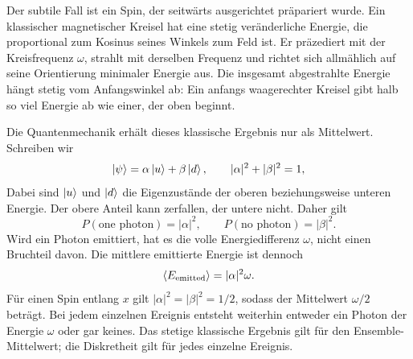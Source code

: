 Der subtile Fall ist ein Spin, der seitwärts ausgerichtet präpariert wurde. Ein klassischer magnetischer Kreisel hat eine stetig veränderliche Energie, die proportional zum Kosinus seines Winkels zum Feld ist. Er präzediert mit der Kreisfrequenz \(\omega\), strahlt mit derselben Frequenz und richtet sich allmählich auf seine Orientierung minimaler Energie aus. Die insgesamt abgestrahlte Energie hängt stetig vom Anfangswinkel ab: Ein anfangs waagerechter Kreisel gibt halb so viel Energie ab wie einer, der oben beginnt.

Die Quantenmechanik erhält dieses klassische Ergebnis nur als Mittelwert. Schreiben wir
\begin{equation}
\left\lvert\psi\right\rangle=\alpha\left\lvert u\right\rangle+\beta\left\lvert d\right\rangle,
\qquad
|\alpha|^2+|\beta|^2=1,
\label{eq:l6-superposed-spin}
\end{equation}
Dabei sind \(\left\lvert u\right\rangle\) und \(\left\lvert d\right\rangle\) die Eigenzustände der oberen beziehungsweise unteren Energie. Der obere Anteil kann zerfallen, der untere nicht. Daher gilt
\begin{equation}
P(\text{one photon})=|\alpha|^2,
\qquad
P(\text{no photon})=|\beta|^2.
\end{equation}
Wird ein Photon emittiert, hat es die volle Energiedifferenz \(\omega\), nicht einen Bruchteil davon. Die mittlere emittierte Energie ist dennoch
\begin{equation}
\left\langle E_{\rm emitted}\right\rangle=|\alpha|^2\omega.
\end{equation}
Für einen Spin entlang \(x\) gilt \(|\alpha|^2=|\beta|^2=1/2\), sodass der Mittelwert \(\omega/2\) beträgt. Bei jedem einzelnen Ereignis entsteht weiterhin entweder ein Photon der Energie \(\omega\) oder gar keines. Das stetige klassische Ergebnis gilt für den Ensemble-Mittelwert; die Diskretheit gilt für jedes einzelne Ereignis.

\begin{classroomqa}
\end{classroomqa}

